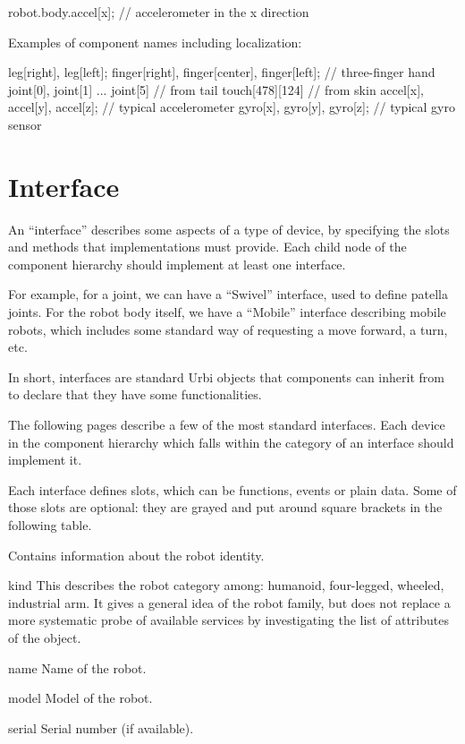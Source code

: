 \begin{urbiunchecked}
robot.body.accel[x]; // accelerometer in the x direction
\end{urbiunchecked}


Examples of component names including localization:

\begin{urbiunchecked}
leg[right], leg[left];
finger[right], finger[center], finger[left];  // three-finger hand
joint[0], joint[1] ... joint[5]               // from tail
touch[478][124]                               // from skin
accel[x], accel[y], accel[z];                 // typical accelerometer
gyro[x], gyro[y], gyro[z];                    // typical gyro sensor
\end{urbiunchecked}

\section{Interface}
\label{sec:interface}

An ``interface'' describes some aspects of a type of device, by specifying
the slots and methods that implementations must provide. Each child node of
the component hierarchy should implement at least one interface.

For example, for a joint, we can have a ``Swivel'' interface, used to define
patella joints. For the robot body itself, we have a ``Mobile'' interface
describing mobile robots, which includes some standard way of requesting a
move forward, a turn, etc.

In short, interfaces are standard Urbi objects that components can inherit
from to declare that they have some functionalities.

The following pages describe a few of the most standard interfaces. Each
device in the component hierarchy which falls within the category of an
interface should implement it.

Each interface defines slots, which can be functions, events or plain data.
Some of those slots are optional: they are grayed and put around square
brackets in the following table.


Contains information about the robot identity.

\begin{urbiscriptapi}
\item[kind]%
  This describes the robot category among: humanoid, four-legged, wheeled,
  industrial arm. It gives a general idea of the robot family, but does not
  replace a more systematic probe of available services by investigating the
  list of attributes of the object.

\item[name]%
  Name of the robot.

\item[model] Model of the robot.

\item[serial] Serial number (if available).
\end{urbiscriptapi}


